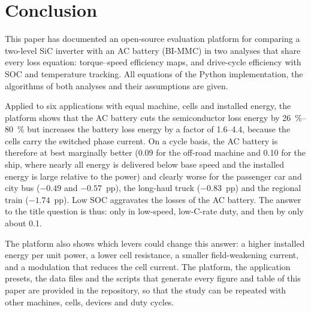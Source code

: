 \section{Conclusion}
This paper has documented an open-source evaluation platform for comparing a two-level SiC inverter with an AC battery (BI-MMC) in two analyses that share every loss equation: torque--speed efficiency maps, and drive-cycle efficiency with SOC and temperature tracking. All equations of the Python implementation, the algorithms of both analyses and their assumptions are given.

Applied to six applications with equal machine, cells and installed energy, the platform shows that the AC battery cuts the semiconductor loss energy by \SIrange{26}{80}{\percent} but increases the battery loss energy by a factor of \numrange{1.6}{4.4}, because the cells carry the switched phase current. On a cycle basis, the AC battery is therefore at best marginally better (\SI{+0.09}{\pp} for the off-road machine and \SI{+0.10}{\pp} for the ship, where nearly all energy is delivered below base speed and the installed energy is large relative to the power) and clearly worse for the passenger car and city bus ($-0.49$ and $-0.57$~pp), the long-haul truck ($-0.83$~pp) and the regional train ($-1.74$~pp). Low SOC aggravates the losses of the AC battery. The answer to the title question is thus: only in low-speed, low-C-rate duty, and then by only about \SI{0.1}{\pp}.

The platform also shows which levers could change this answer: a higher installed energy per unit power, a lower cell resistance, a smaller field-weakening current, and a modulation that reduces the cell current. The platform, the application presets, the data files and the scripts that generate every figure and table of this paper are provided in the repository, so that the study can be repeated with other machines, cells, devices and duty cycles.
